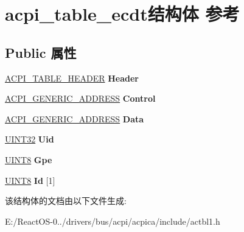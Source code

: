 \hypertarget{structacpi__table__ecdt}{}\section{acpi\+\_\+table\+\_\+ecdt结构体 参考}
\label{structacpi__table__ecdt}
\subsection*{Public 属性}
\begin{DoxyCompactItemize}
\item 
\mbox{\label{structacpi__table__ecdt_ae17a270425ee64f55dcb9033be65c9e3}} 
\hyperlink{structacpi__table__header}{A\+C\+P\+I\+\_\+\+T\+A\+B\+L\+E\+\_\+\+H\+E\+A\+D\+ER} {\bfseries Header}
\item 
\mbox{\label{structacpi__table__ecdt_a0f1c05e96e02d84c9ce6bfff6287afe0}} 
\hyperlink{structacpi__generic__address}{A\+C\+P\+I\+\_\+\+G\+E\+N\+E\+R\+I\+C\+\_\+\+A\+D\+D\+R\+E\+SS} {\bfseries Control}
\item 
\mbox{\label{structacpi__table__ecdt_a3cee9aca4dc5130c1f8579b3601e1a55}} 
\hyperlink{structacpi__generic__address}{A\+C\+P\+I\+\_\+\+G\+E\+N\+E\+R\+I\+C\+\_\+\+A\+D\+D\+R\+E\+SS} {\bfseries Data}
\item 
\mbox{\label{structacpi__table__ecdt_a5bd3d9b14e0ba27397e782fff668b363}} 
\hyperlink{_processor_bind_8h_ae1e6edbbc26d6fbc71a90190d0266018}{U\+I\+N\+T32} {\bfseries Uid}
\item 
\mbox{\label{structacpi__table__ecdt_a816d6d02e0348a5a1b3e5a0330b05e72}} 
\hyperlink{_processor_bind_8h_ab27e9918b538ce9d8ca692479b375b6a}{U\+I\+N\+T8} {\bfseries Gpe}
\item 
\mbox{\label{structacpi__table__ecdt_a4a8888a3d61187841c129401ae4af93f}} 
\hyperlink{_processor_bind_8h_ab27e9918b538ce9d8ca692479b375b6a}{U\+I\+N\+T8} {\bfseries Id} \mbox{[}1\mbox{]}
\end{DoxyCompactItemize}


该结构体的文档由以下文件生成\+:\begin{DoxyCompactItemize}
\item 
E\+:/\+React\+O\+S-\/0../drivers/bus/acpi/acpica/include/actbl1.\+h\end{DoxyCompactItemize}

